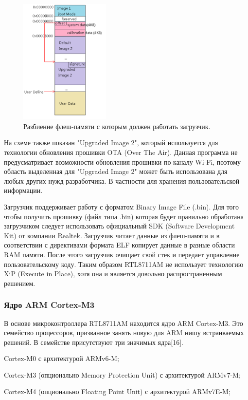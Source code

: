 \begin{figure}[h!]
    \centering
    \includegraphics[width=0.4\textwidth]{rtl8711am_flash_layout.png}
    \caption{Разбиение флеш-памяти с которым должен работать загрузчик.}
\end{figure}

На схеме также показан "Upgraded Image 2", который используется для технологии обновления прошивки OTA (Over The Air). Данная программа не предусматривает возможности обновления прошивки по каналу Wi-Fi, поэтому область выделенная для "Upgraded Image 2" может быть использована для любых других нужд разработчика. В частности для хранения пользовательской информации.


Загрузчик поддерживает работу с форматом Binary Image File (.bin). Для того чтобы получить прошивку (файл типа .bin) которая будет правильно обработана загрузчиком следует использовать официальный SDK (Software Development Kit) от компании Realtek. Загрузчик читает данные из флеш-памяти и в соответствии с директивами формата ELF копирует данные в разные области RAM памяти. После этого загрузчик очищает свой стек и передает управление пользовательскому коду. Таким образом RTL8711AM не использует технологию XiP (Execute in Place), хотя она и является довольно распространенным решением.

\subsubsection{ Ядро ARM Cortex-M3}
В основе микроконтроллера RTL8711AM находится ядро ARM Cortex-M3. Это семейство процессоров, призванное занять новую для ARM нишу встраиваемых решений. В семействе присутствуют три значимых ядра[16].

\begin{my_enumerate}
\item Cortex-M0 с архитектурой ARMv6-M;
\item Cortex-M3 (опционально Memory Protection Unit) с архитектурой ARMv7-M;
\item Cortex-M4 (опционально Floating Point Unit) с архитектурой ARMv7E-M;
\end{my_enumerate}

